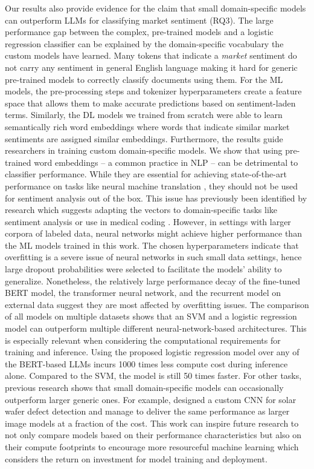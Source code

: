 Our results also provide evidence for the claim that small domain-specific models can outperform LLMs for classifying market sentiment (RQ3). The large performance gap between the complex, pre-trained models and a logistic regression classifier can be explained by the domain-specific vocabulary the custom models have learned. Many tokens that indicate a \emph{market} sentiment do not carry any sentiment in general English language making it hard for generic pre-trained models to correctly classify documents using them.  For the ML models, the pre-processing steps and tokenizer hyperparameters create a feature space that allows them to make accurate predictions based on sentiment-laden terms. Similarly, the DL models we trained from scratch were able to learn semantically rich word embeddings where words that indicate similar market sentiments are assigned similar embeddings. Furthermore, the results guide researchers in training custom domain-specific models. We show that using pre-trained word embeddings -- a common practice in NLP -- can be detrimental to classifier performance. While they are essential for achieving state-of-the-art performance on tasks like neural machine translation , they should not be used for sentiment analysis out of the box. This issue has previously been identified by research which suggests adapting the vectors to domain-specific tasks like sentiment analysis  or use in medical coding .\newline
However, in settings with larger corpora of labeled data, neural networks might achieve higher performance than the ML models trained in this work. The chosen hyperparameters indicate that overfitting is a severe issue of neural networks in such small data settings, hence large dropout probabilities were selected to facilitate the models' ability to generalize. Nonetheless, the relatively large performance decay of the fine-tuned BERT model, the transformer neural network, and the recurrent model on external data suggest they are most affected by overfitting issues.
The comparison of all models on multiple datasets shows that an SVM and a logistic regression model can outperform multiple different neural-network-based architectures. This is especially relevant when considering the computational requirements for training and inference. Using the proposed logistic regression model over any of the BERT-based LLMs incurs 1000 times less compute cost during inference alone. Compared to the SVM, the model is still 50 times faster. For other tasks, previous research shows that small domain-specific models can occasionally outperform larger generic ones. For example,  designed a custom CNN for solar wafer defect detection and manage to deliver the same performance as larger image models at a fraction of the cost. This work can inspire future research to not only compare models based on their performance characteristics but also on their compute footprints to encourage more resourceful machine learning which considers the return on investment for model training and deployment.

